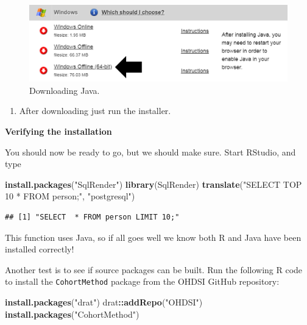 \documentclass[11pt]{book}
\newenvironment{Shaded}{\begin{snugshade}}{\end{snugshade}}
\newcommand{\KeywordTok}[1]{\textcolor[rgb]{0.13,0.29,0.53}{\textbf{#1}}}
\newcommand{\NormalTok}[1]{#1}
\newcommand{\OperatorTok}[1]{\textcolor[rgb]{0.81,0.36,0.00}{\textbf{#1}}}
\newcommand{\StringTok}[1]{\textcolor[rgb]{0.31,0.60,0.02}{#1}}
\providecommand{\tightlist}{%
  \setlength{\itemsep}{0pt}\setlength{\parskip}{0pt}}
\theoremstyle{definition}
\theoremstyle{definition}
\theoremstyle{definition}
\theoremstyle{remark}
\begin{document}
\begin{figure}

{\centering \includegraphics[width=1\linewidth]{images/OhdsiAnalyticsTools/downloadJava} 

}

\caption{Downloading Java.}\label{fig:downloadJava}
\end{figure}

\begin{enumerate}
\def\labelenumi{\arabic{enumi}.}
\setcounter{enumi}{1}
\tightlist
\item
  After downloading just run the installer.
\end{enumerate}

\textbf{Verifying the installation}

You should now be ready to go, but we should make sure. Start RStudio, and type

\begin{Shaded}
\begin{Highlighting}[]
\KeywordTok{install.packages}\NormalTok{(}\StringTok{"SqlRender"}\NormalTok{)}
\KeywordTok{library}\NormalTok{(SqlRender)}
\KeywordTok{translate}\NormalTok{(}\StringTok{"SELECT TOP 10 * FROM person;"}\NormalTok{, }\StringTok{"postgresql"}\NormalTok{)}
\end{Highlighting}
\end{Shaded}

\begin{verbatim}
## [1] "SELECT  * FROM person LIMIT 10;"
\end{verbatim}

This function uses Java, so if all goes well we know both R and Java have been installed correctly!

Another test is to see if source packages can be built. Run the following R code to install the \texttt{CohortMethod} package from the OHDSI GitHub repository:

\begin{Shaded}
\begin{Highlighting}[]
\KeywordTok{install.packages}\NormalTok{(}\StringTok{"drat"}\NormalTok{)}
\NormalTok{drat}\OperatorTok{::}\KeywordTok{addRepo}\NormalTok{(}\StringTok{"OHDSI"}\NormalTok{)}
\KeywordTok{install.packages}\NormalTok{(}\StringTok{"CohortMethod"}\NormalTok{)}
\end{Highlighting}
\end{Shaded}
\end{document}
